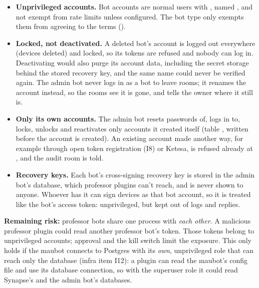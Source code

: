 \begin{itemize}
        professor bot.  removes them and locks their accounts; it
        only sees bots in the  table, which the admin bot itself is never in.
  \item \textbf{Unprivileged accounts.} Bot accounts are normal users with ,
        named , and not exempt from rate limits unless configured. The
        bot type only exempts them from agreeing to the terms ().
  \item \textbf{Locked, not deactivated.} A deleted bot's account is logged out everywhere
        (devices deleted) and locked, so its tokens are refused and nobody can log in.
        Deactivating would also purge its account data, including the secret storage behind
        the stored recovery key, and the same name could never be verified again. The admin
        bot never logs in as a bot to leave rooms; it renames the account instead, so the
        rooms see it is gone, and tells the owner where it still is.
  \item \textbf{Only its own accounts.} The admin bot resets passwords of, logs in to,
        locks, unlocks and reactivates only  accounts it created itself (table
        , written before the account is created). An existing
         account made another way, for example through open token
        registration (I8) or Ketesa, is refused already at , and the
        audit room is told.
  \item \textbf{Recovery keys.} Each bot's cross-signing recovery key is stored in the admin
        bot's database, which professor plugins can't reach, and is never shown to anyone.
        Whoever has it can sign devices as that bot account, so it is treated like the
        bot's access token: unprivileged, but kept out of logs and replies.
\end{itemize}

\textbf{Remaining risk:} professor bots share one process with \emph{each other}. A
malicious professor plugin could read another professor bot's token. Those tokens belong to
unprivileged accounts; approval and the kill switch limit the exposure. This only holds if
the  maubot connects to Postgres with its \emph{own}, unprivileged role that
can reach only the  database (infra item I12): a plugin can read the maubot's
config file and use its database connection, so with the superuser role it could read
Synapse's and the admin bot's databases.

